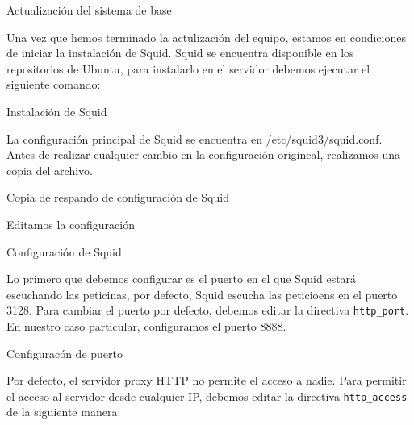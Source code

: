 \begin{listing}[H]
  \caption{Actualización del sistema de base}
  \label{soa:tecnologias:squid-cache:bash-preparacion}
\end{listing}

Una vez que hemos terminado la actulización del equipo, estamos en condiciones de iniciar la instalación de Squid.  Squid se encuentra disponible en los repositorios de Ubuntu, para instalarlo en el servidor debemos ejecutar el siguiente comando:

\begin{listing}[H]
  \caption{Instalación de Squid}
  \label{soa:tecnologias:squid-cache01:bash-preparacion}
\end{listing}

La configuración principal de Squid se encuentra en /etc/squid3/squid.conf.  Antes de realizar cualquier cambio en la configuración origincal, realizamos una copia del archivo.

\begin{listing}[H]
  \caption{Copia de respando de configuración de Squid}
  \label{soa:tecnologias:squid-cache02:bash-preparacion}
\end{listing}

Editamos la configuración

\begin{listing}[H]
  \caption{Configuración de Squid}
  \label{soa:tecnologias:squid-cache03:bash-preparacion}
\end{listing}

Lo primero que debemos configurar es el puerto en el que Squid estará escuchando las peticinas, por defecto, Squid escucha las peticioens en el puerto 3128.  Para cambiar el puerto por defecto, debemos editar la directiva \texttt{http\_port}.  En nuestro caso particular, configuramos el puerto 8888.

\begin{listing}[H]
  \caption{Configuracón de puerto}
  \label{soa:tecnologias:squid-cache04:bash-preparacion}
\end{listing}

Por defecto, el servidor proxy HTTP no permite el acceso a nadie.  Para permitir el acceso al servidor desde cualquier IP, debemos editar la directiva \texttt{http\_access} de la siguiente manera:

